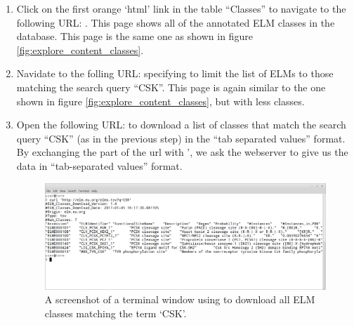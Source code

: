 \begin{enumerate}
\item Click on the first orange `html' link in the table ``Classes'' to
	navigate to the following URL:
	. This page shows all of the
	annotated ELM classes in the database. This page is the same one as
	shown in figure \ref{fig:explore_content_classes}.

\item Navidate to the folling URL: 
	specifying  to limit the list of ELMs to those matching the
	search query ``CSK''. This page is again similar to the one shown in
	figure \ref{fig:explore_content_classes}, but with less classes.



\item Open the following URL:  to download a
	list of classes that match the search query ``CSK'' (as in the previous
	step) in the ``tab separated values'' format. By exchanging the
	 part of the url with ', we ask the
	webserver to give us the data in ``tab-separated values'' format.


\begin{figure}[h!]
	\centering
	\includegraphics[width=\textwidth]{Figures/search_REST/elm_curl_classes_CSK.png}
	\caption{
	A screenshot of a terminal window using
	 to download all ELM classes matching the term `CSK'.
	}
	\label{fig:search_REST_curl_csk}
\end{figure}


\end{enumerate}
